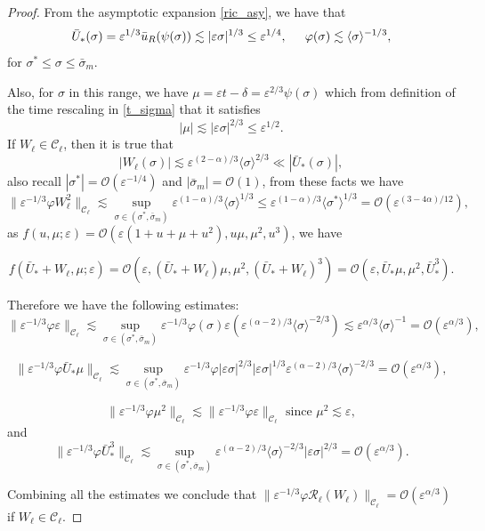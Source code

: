 \documentclass[letterpaper,11pt]{article}
\newcommand{\rmO}{\mathcal{O}}
\newcommand{\eps}{\varepsilon}
\newcommand{\lar}{ \lesssim }
\numberwithin{equation}{section}
\theoremstyle{plain}
\begin{document}
\begin{proof}
From the asymptotic expansion \eqref{ric_asy}, we have that
\[
\bar{U}_*(\sigma) = \eps^{1/3} \bar{u}_R(\psi(\sigma)) \lar |\eps \sigma|^{1/3}\le \eps^{1/4}, \hspace{0.2in} \varphi(\sigma) \lar \langle\sigma\rangle^{-1/3} ,
\]
for $\sigma^*\le \sigma \le \bar{\sigma}_m$.

Also, for $\sigma$ in this range, we have $\mu = \eps t -\delta = \eps^{2/3}\psi(\sigma)$ which from definition of the time rescaling in \ref{t_sigma}  that it satisfies
\[
|\mu| \lar |\eps \sigma|^{2/3} \le \eps^{1/2}.
\]
If $W_\ell \in \mathcal{C}_\ell$, then it is true that
\[
|W_\ell(\sigma)| \lar \eps^{(2-\alpha)/3} \langle \sigma \rangle^{2/3} \ll |\bar{U}_*(\sigma)|, 
\]
also recall $|\sigma^*| = \rmO(\eps^{-1/4})$ and $|\bar{\sigma}_m| = \rmO(1)$, from these facts we have
\[
\|\eps^{-1/3}\varphi W_\ell^2\|_{\mathcal{C}_\ell} \lar \sup_{\sigma \in (\sigma^{*},\bar{\sigma}_m)} \eps^{(1-\alpha)/3}\langle \sigma\rangle^{1/3}  \le \eps^{(1-\alpha)/3} \langle \sigma^{*} \rangle^{1/3} = \rmO(\eps^{(3-4\alpha)/12}),
\]
as $f(u,\mu; \eps) = \rmO(\eps(1+u+\mu+u^2),u\mu,\mu^2,u^3)$, we have

\[
f(\bar{U}_*+W_\ell, \mu ;\eps) = \rmO(\eps, (\bar{U}_*+W_\ell)\mu, \mu^2, (\bar{U}_*+W_\ell)^3 ) = \rmO(\eps, \bar{U}_*\mu, \mu^2, \bar{U}_*^3).
\]

Therefore we have the following estimates:
\[
\|\eps^{-1/3}\varphi \eps \|_{\mathcal{C}_\ell} \lar \sup_{\sigma \in (\sigma^{*},\bar{\sigma}_m)} \eps^{-1/3} \varphi(\sigma) \eps (\eps^{(\alpha-2)/3}\langle \sigma\rangle^{-2/3}) \lar \eps^{\alpha/3} \langle\sigma\rangle^{-1} =\rmO(\eps^{\alpha/3}),
\]

\[
\|\eps^{-1/3}\varphi \bar{U}_*\mu \|_{\mathcal{C}_\ell} \lar \sup_{\sigma \in (\sigma^{*},\bar{\sigma}_m)} \eps^{-1/3}\varphi |\eps\sigma|^{2/3}|\eps\sigma|^{1/3}\eps^{(\alpha-2)/3}\langle \sigma\rangle^{-2/3}  = \rmO(\eps^{\alpha/3}),
\]

\[
\|\eps^{-1/3}\varphi \mu^2 \|_{\mathcal{C}_\ell} \lar \|\eps^{-1/3}\varphi \eps \|_{\mathcal{C}_\ell} \text{ since } \mu^2 \lar \eps,
\]
and 
\[
\|\eps^{-1/3}\varphi \bar{U}_*^3 \|_{\mathcal{C}_\ell}  \lar \sup_{\sigma \in (\sigma^{*},\bar{\sigma}_m)}\eps^{(\alpha-2)/3}\langle \sigma\rangle^{-2/3} |\eps \sigma|^{2/3} = \rmO(\eps^{\alpha/3}).
\]

Combining all the estimates we conclude that $\|\eps^{-1/3}\varphi \mathcal{R}_\ell(W_\ell)\|_{\mathcal{C}_\ell} = \rmO(\eps^{\alpha/3})$ if $W_\ell \in \mathcal{C}_\ell$.
\end{proof}
\end{document}
